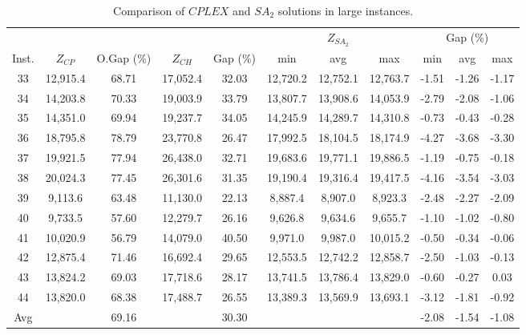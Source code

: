 \documentclass[11pt]{article}
\begin{document}
\begin{table}[H]
    \footnotesize
    \centering
\begin{tabular}{ccc ccc ccc cc}
\toprule
&  &  &  &  & \multicolumn{3}{c}{$Z_{SA_2}$} & \multicolumn{3}{c}{Gap (\%)} \\ \cmidrule(l){6-11} 
Inst. & $Z_{CP}$ & O.Gap (\%) & $Z_{CH}$ & Gap (\%) & min & avg & max & min & avg & max \\ \midrule
\multicolumn{1}{c|}{33} & 12,915.4 & 68.71 & 17,052.4 & 32.03 & 12,720.2 & 12,752.1 & 12,763.7 & -1.51 & -1.26 & -1.17 \\
\multicolumn{1}{c|}{34} & 14,203.8 & 70.33 & 19,003.9 & 33.79 & 13,807.7 & 13,908.6 & 14,053.9 & -2.79 & -2.08 & -1.06 \\
\multicolumn{1}{c|}{35} & 14,351.0 & 69.94 & 19,237.7 & 34.05 & 14,245.9 & 14,289.7 & 14,310.8 & -0.73 & -0.43 & -0.28 \\
\multicolumn{1}{c|}{36} & 18,795.8 & 78.79 & 23,770.8 & 26.47 & 17,992.5 & 18,104.5 & 18,174.9 & -4.27 & -3.68 & -3.30 \\
\multicolumn{1}{c|}{37} & 19,921.5 & 77.94 & 26,438.0 & 32.71 & 19,683.6 & 19,771.1 & 19,886.5 & -1.19 & -0.75 & -0.18 \\
\multicolumn{1}{c|}{38} & 20,024.3 & 77.45 & 26,301.6 & 31.35 & 19,190.4 & 19,316.4 & 19,417.5 & -4.16 & -3.54 & -3.03 \\
\multicolumn{1}{c|}{39} & 9,113.6 & 63.48 & 11,130.0 & 22.13 & 8,887.4 & 8,907.0 & 8,923.3 & -2.48 & -2.27 & -2.09 \\
\multicolumn{1}{c|}{40} & 9,733.5 & 57.60 & 12,279.7 & 26.16 & 9,626.8 & 9,634.6 & 9,655.7 & -1.10 & -1.02 & -0.80 \\
\multicolumn{1}{c|}{41} & 10,020.9 & 56.79 & 14,079.0 & 40.50 & 9,971.0 & 9,987.0 & 10,015.2 & -0.50 & -0.34 & -0.06 \\
\multicolumn{1}{c|}{42} & 12,875.4 & 71.46 & 16,692.4 & 29.65 & 12,553.5 & 12,742.2 & 12,858.7 & -2.50 & -1.03 & -0.13 \\
\multicolumn{1}{c|}{43} & 13,824.2 & 69.03 & 17,718.6 & 28.17 & 13,741.5 & 13,786.4 & 13,829.0 & -0.60 & -0.27 & 0.03 \\
\multicolumn{1}{c|}{44} & 13,820.0 & 68.38 & 17,488.7 & 26.55 &13,389.3 & 13,569.9 & 13,693.1 & -3.12 & -1.81 & -0.92 \\ \hline\hline
\multicolumn{1}{c|}{Avg} &  & 69.16 &  & 30.30 &  &  &  & -2.08 & -1.54 & -1.08 \\ \bottomrule
\end{tabular}
\caption{Comparison of $CPLEX$ and $SA_{2}$ solutions in large instances.}
	\label{large_result}%
\end{table}
\end{document}
